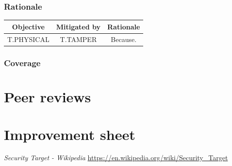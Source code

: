 \documentclass[10pt]{article}
\begin{document}
      \subsubsection{Rationale}
		
	\begin{tabular}{| c | c | c |}
	  \hline
	  Objective & Mitigated by & Rationale \\
	  \hline
	  T.PHYSICAL & T.TAMPER & Because. \\
	  \hline
	\end{tabular} 

      \subsubsection{Coverage}
        

  \section{Peer reviews}

  \section{Improvement sheet}

  \begin{thebibliography}{9}
	 \textit{Security Target - Wikipedia} \url{https://en.wikipedia.org/wiki/Security_Target}
  \end{thebibliography}
\end{document}
